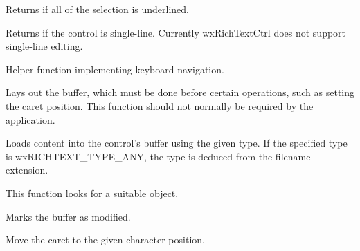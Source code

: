 
Returns \true if all of the selection is underlined.

\label{wxrichtextctrlissingleline}


Returns \true if the control is single-line. Currently wxRichTextCtrl does not
support single-line editing.

\label{wxrichtextctrlkeyboardnavigate}


Helper function implementing keyboard navigation.

\label{wxrichtextctrllayoutcontent}


Lays out the buffer, which must be done before certain operations, such as
setting the caret position. This function should not normally be required by the
application.

\label{wxrichtextctrlloadfile}


Loads content into the control's buffer using the given type. If the specified type
is wxRICHTEXT\_TYPE\_ANY, the type is deduced from the filename extension.

This function looks for a suitable  object.

\label{wxrichtextctrlmarkdirty}


Marks the buffer as modified.

\label{wxrichtextctrlmovecaret}


Move the caret to the given character position.

\label{wxrichtextctrlmovecaretback}

